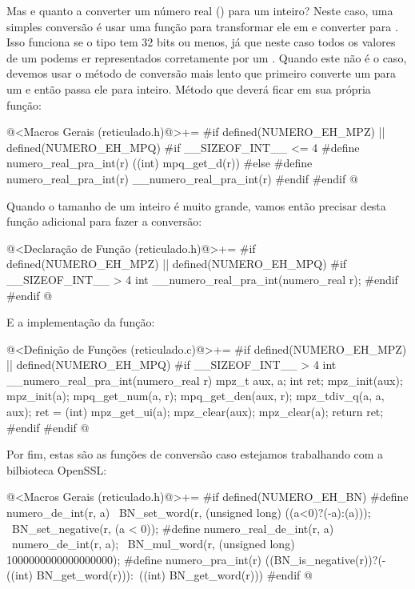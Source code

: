 Mas e quanto a converter um número real () para um
inteiro? Neste caso, uma simples conversão é usar uma função para
transformar ele em  e converter
para . Isso funciona se o tipo  tem 32
bits ou menos, já que neste caso todos os valores de
um  podems er representados corretamente por
um . Quando este não é o caso, devemos usar o
método de conversão mais lento que primeiro converte
um  para um  e então passa ele
para inteiro. Método que deverá ficar em sua própria função:

\iniciocodigo
@<Macros Gerais (reticulado.h)@>+=
#if defined(NUMERO_EH_MPZ) || defined(NUMERO_EH_MPQ)
#if __SIZEOF_INT__ <= 4
#define numero_real_pra_int(r) ((int) mpq_get_d(r))
#else
#define numero_real_pra_int(r) __numero_real_pra_int(r)
#endif
#endif
@
\fimcodigo

Quando o tamanho de um inteiro é muito grande, vamos então precisar
desta função adicional para fazer a conversão:

\iniciocodigo
@<Declaração de Função (reticulado.h)@>+=
#if defined(NUMERO_EH_MPZ) || defined(NUMERO_EH_MPQ)
#if __SIZEOF_INT__ > 4
int __numero_real_pra_int(numero_real r);
#endif
#endif
@
\fimcodigo

E a implementação da função:

\iniciocodigo
@<Definição de Funções (reticulado.c)@>+=
#if defined(NUMERO_EH_MPZ) || defined(NUMERO_EH_MPQ)
#if __SIZEOF_INT__ > 4
int __numero_real_pra_int(numero_real r){
  mpz_t aux, a;
  int ret;
  mpz_init(aux);
  mpz_init(a);
  mpq_get_num(a, r);
  mpq_get_den(aux, r);
  mpz_tdiv_q(a, a, aux);
  ret = (int) mpz_get_ui(a);
  mpz_clear(aux);
  mpz_clear(a);
  return ret;
}
#endif
#endif
@
\fimcodigo

Por fim, estas são as funções de conversão caso estejamos trabalhando
com a bilbioteca OpenSSL:

\iniciocodigo
@<Macros Gerais (reticulado.h)@>+=
#if defined(NUMERO_EH_BN)
#define numero_de_int(r, a)                                     \
          {BN_set_word(r, (unsigned long) ((a<0)?(-a):(a)));    \
           BN_set_negative(r, (a < 0));}
#define numero_real_de_int(r, a)   \
          {numero_de_int(r, a);  \
           BN_mul_word(r, (unsigned long) 1000000000000000000);}
#define numero_pra_int(r) ((BN_is_negative(r))?(-((int) BN_get_word(r))):\
                                              ((int) BN_get_word(r)))
#endif
@
\fimcodigo

